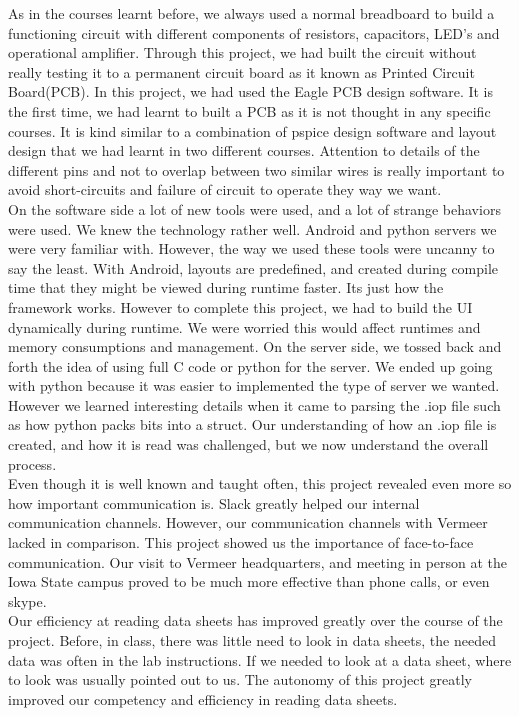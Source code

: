 \documentclass[paper=a4, fontsize=11pt]{scrartcl}
\numberwithin{equation}{section}		%
\numberwithin{figure}{section}			%
\numberwithin{table}{section}				%
\begin{document}
As in the courses learnt before, we always used a normal breadboard to build a functioning circuit with different components of resistors, capacitors, LED’s and operational amplifier. Through this project, we had built the circuit without really testing it to a permanent circuit board as it known as Printed Circuit Board(PCB). In this project, we had used the Eagle PCB design software. It is the first time, we had learnt to built a PCB as it is not thought in any specific courses. It is kind similar to a combination of pspice design software and layout design that we had learnt in two different courses. Attention to details of the different pins and not to overlap between two similar wires is really important to avoid short-circuits and failure of circuit to operate they way we want.\\

On the software side a lot of new tools were used, and a lot of strange behaviors were used. We knew the technology rather well. Android and python servers we were very familiar with. However, the way we used these tools were uncanny to say the least. With Android, layouts are predefined, and created during compile time that they might be viewed during runtime faster. Its just how the framework works. However to complete this project, we had to build the UI dynamically during runtime. We were worried this would affect runtimes and memory consumptions and management. On the server side, we tossed back and forth the idea of using full C code or python for the server. We ended up going with python because it was easier to implemented the type of server we wanted. However we learned interesting details when it came to parsing the .iop file such as how python packs bits into a struct. Our understanding of how an .iop file is created, and how it is read was challenged, but we now understand the overall process.\\

Even though it is well known and taught often, this project revealed even more so how important communication is. Slack greatly helped our internal communication channels. However, our communication channels with Vermeer lacked in comparison. This project showed us the importance of face-to-face communication. Our visit to Vermeer headquarters, and meeting in person at the Iowa State campus proved to be much more effective than phone calls, or even skype.\\

Our efficiency at reading data sheets has improved greatly over the course of the project. Before, in class, there was little need to look in data sheets, the needed data was often in the lab instructions. If we needed to look at a data sheet, where to look was usually pointed out to us. The autonomy of this project greatly improved our competency and efficiency in reading data sheets.\\
\end{document}
